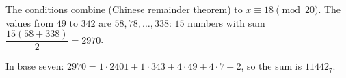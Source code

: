The conditions combine (Chinese remainder theorem) to $x\equiv18\pmod{20}$. The values from $49$ to $342$ are $58,78,\dots,338$: $15$ numbers with sum $\dfrac{15(58+338)}{2}=2970$.

In base seven: $2970=1\cdot2401+1\cdot343+4\cdot49+4\cdot7+2$, so the sum is $\boxed{11442_7}$.
